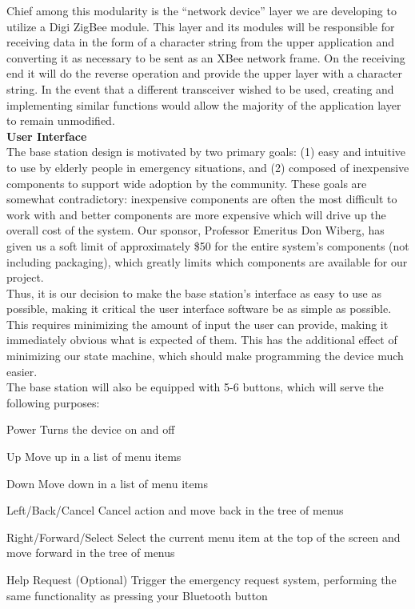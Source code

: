 \documentclass[journal,compsoc]{IEEEtran}
\begin{document}
\noindent Chief among this modularity is the “network device” layer we are developing to utilize a Digi ZigBee module. This layer and its modules will be responsible for receiving data in the form of a character string from the upper application and converting it as necessary to be sent as an XBee network frame. On the receiving end it will do the reverse operation and provide the upper layer with a character string. In the event that a different transceiver wished to be used, creating and implementing similar functions would allow the majority of the application layer to remain unmodified.\\

\noindent \textbf {User Interface}\\
The base station design is motivated by two primary goals: (1) easy and intuitive to use by elderly people in emergency situations, and (2) composed of inexpensive components to support wide adoption by the community.  These goals are somewhat contradictory: inexpensive components are often the most difficult to work with and better components are more expensive which will drive up the overall cost of the system.  Our sponsor, Professor Emeritus Don Wiberg, has given us a soft limit of approximately \$50 for the entire system’s components (not including packaging), which greatly limits which components are available for our project.\\

\noindent Thus, it is our decision to make the base station’s interface as easy to use as possible, making it critical the user interface software be as simple as possible.  This requires minimizing the amount of input the user can provide, making it immediately obvious what is expected of them.  This has the additional effect of minimizing our state machine, which should make programming the device much easier.\\

\noindent The base station will also be equipped with 5-6 buttons, which will serve the following purposes:\\

\begin{LaTeXdescription}
\item[Power] Turns the device on and off
\item[Up] Move up in a list of menu items
\item[Down] Move down in a list of menu items
\item[Left/Back/Cancel] Cancel action and move back in the tree of menus
\item[Right/Forward/Select] Select the current menu item at the top of the screen and move forward in the tree of menus
\item[Help Request (Optional)] Trigger the emergency request system, performing the same functionality as pressing your Bluetooth button\\
\end{LaTeXdescription}
\end{document}
